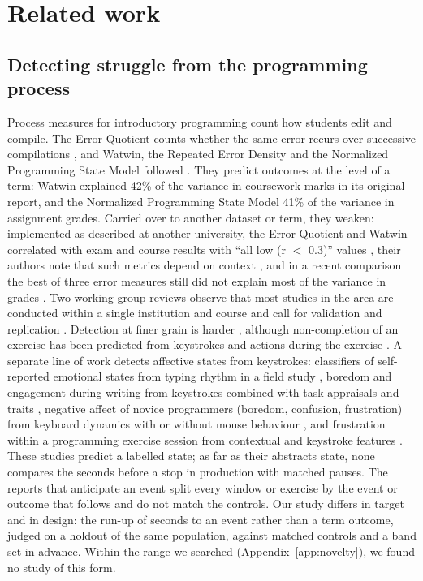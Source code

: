 \section{Related work}
\label{sec:related}

\subsection{Detecting struggle from the programming process}

Process measures for introductory programming count how students edit and compile. The Error Quotient counts whether
the same error recurs over successive compilations \cite{jadud2006methods}, and Watwin, the Repeated Error Density and
the Normalized Programming State Model followed
\cite{watson2013predicting,becker2016new,carter2015normalized}. They predict outcomes at the level of a term: Watwin
explained 42\% of the variance in coursework marks in its original report, and the Normalized Programming State Model
41\% of the variance in assignment grades. Carried over to another dataset or term, they weaken: implemented as
described at another university, the Error Quotient and Watwin correlated with exam and course results with ``all low
(r $<$ 0.3)'' values \cite{ahadi2015exploring}, their authors note that such metrics depend on context
\cite{ahadi2018syntax,petersen2015exploration}, and in a recent comparison the best of three error measures still did
not explain most of the variance in grades \cite{svabensky2024comparison}. Two working-group reviews observe that most
studies in the area are conducted within a single institution and course and call for validation and replication
\cite{ihantola2015educational,hellas2018predicting}. Detection at finer grain is harder
\cite{rodrigo2009coarse}, although non-completion of an exercise has been predicted from keystrokes and actions during
the exercise \cite{fwa2019predicting,kofune2026struggling}. A separate line of work detects affective states from
keystrokes: classifiers of self-reported emotional states from typing rhythm in a field study \cite{epp2011emotional},
boredom and engagement during writing from keystrokes combined with task appraisals and traits
\cite{bixler2013boredom}, negative affect of novice programmers (boredom, confusion, frustration) from keyboard
dynamics with or without mouse behaviour \cite{vea2017negative}, and frustration within a programming exercise session
from contextual and keystroke features \cite{fwa2015frustration}. These studies predict a labelled state; as far as
their abstracts state, none compares the seconds before a stop in production with matched pauses. The reports that anticipate an event
\cite{barron2026tutortrace,maniktala2020helpneed,zhang2019wheel} split every window or exercise by the event or outcome
that follows and do not match the controls. Our study differs in target and in design: the run-up of seconds to an event
rather than a term outcome, judged on a holdout of the same population, against matched controls and a band set in
advance. Within the range we searched (Appendix~\ref{app:novelty}), we found no study of this form.

